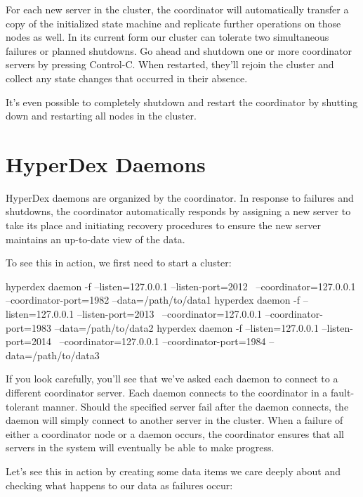 For each new server in the cluster, the coordinator will automatically transfer
a copy of the initialized state machine and replicate further operations on
those nodes as well.  In its current form our cluster can tolerate two
simultaneous failures or planned shutdowns.  Go ahead and shutdown one or more
coordinator servers by pressing Control-C.  When restarted, they'll rejoin the
cluster and collect any state changes that occurred in their absence.

It's even possible to completely shutdown and restart the coordinator by
shutting down and restarting all nodes in the cluster.

\section{HyperDex Daemons}
\label{chap:fault-tolerance:daemons}

HyperDex daemons are organized by the coordinator.  In response to failures and
shutdowns, the coordinator automatically responds by assigning a new server to
take its place and initiating recovery procedures to ensure the new server
maintains an up-to-date view of the data.

To see this in action, we first need to start a cluster:

\begin{consolecode}
hyperdex daemon -f --listen=127.0.0.1 --listen-port=2012 \
                   --coordinator=127.0.0.1 --coordinator-port=1982 --data=/path/to/data1
hyperdex daemon -f --listen=127.0.0.1 --listen-port=2013 \
                   --coordinator=127.0.0.1 --coordinator-port=1983 --data=/path/to/data2
hyperdex daemon -f --listen=127.0.0.1 --listen-port=2014 \
                   --coordinator=127.0.0.1 --coordinator-port=1984 --data=/path/to/data3
\end{consolecode}

If you look carefully, you'll see that we've asked each daemon to connect to a
different coordinator server.  Each daemon connects to the coordinator in a
fault-tolerant manner.  Should the specified server fail after the daemon
connects, the daemon will simply connect to another server in the cluster.  When
a failure of either a coordinator node or a daemon occurs, the coordinator
ensures that all servers in the system will eventually be able to make progress.

Let's see this in action by creating some data items we care deeply about and
checking what happens to our data as failures occur:

